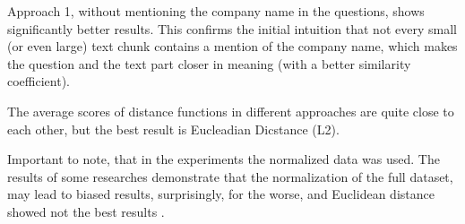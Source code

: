 Approach 1, without mentioning the company name in the questions, shows significantly better results. This confirms the initial intuition that not every small (or even large) text chunk contains a mention of the company name, which makes the question and the text part closer in meaning (with a better similarity coefficient). 

The average scores of distance functions in different approaches are quite close to each other, but the best result is Eucleadian Dicstance (L2). 

Important to note, that in the experiments the normalized data was used. The results of some researches demonstrate that the normalization of the full dataset, may lead to biased results, surprisingly, for the worse, and Euclidean distance showed not the best results \cite{Barboza.30Jun2023}.

